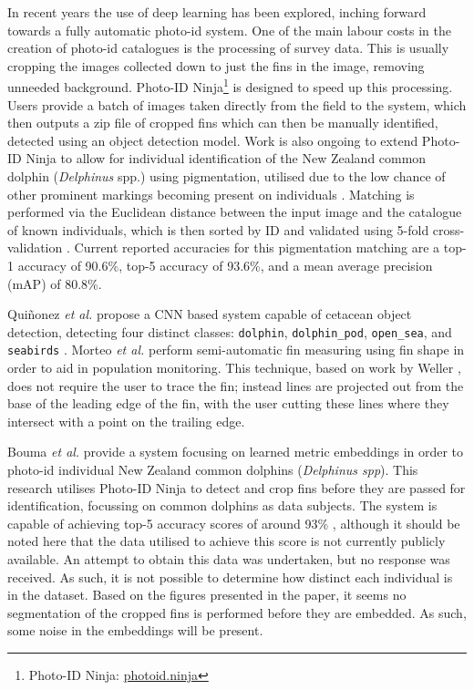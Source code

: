 In recent years the use of deep learning has been explored, inching forward towards a fully automatic photo-id system. One of the main labour costs in the creation of photo-id catalogues is the processing of survey data. This is usually cropping the images collected down to just the fins in the image, removing unneeded background. Photo-ID Ninja\footnote{\label{footnote:photo-idNinja}Photo-ID Ninja: \href{http://photoid.ninja}{photoid.ninja}} is designed to speed up this processing. Users provide a batch of images taken directly from the field to the system, which then outputs a zip file of cropped fins which can then be manually identified, detected using an object detection model.  Work is also ongoing to extend Photo-ID Ninja to allow for individual identification of the New Zealand common dolphin (\textit{Delphinus} spp.) using pigmentation, utilised due to the low chance of other prominent markings becoming present on individuals \cite{gilman_computer-assisted_2016}. Matching is performed via the Euclidean distance between the input image and the catalogue of known individuals, which is then sorted by ID and validated using 5-fold cross-validation \cite{bouma_individual_2018}. Current reported accuracies for this pigmentation matching are a top-1 accuracy of 90.6\%, top-5 accuracy of 93.6\%, and a mean average precision (mAP) of 80.8\%.

Qui\~{n}onez \textit{et al.} propose a CNN based system capable of cetacean object detection, detecting four distinct classes: \texttt{dolphin}, \texttt{dolphin\_pod}, \texttt{open\_sea}, and \texttt{seabirds} \cite{quinonez_using_2019}. Morteo \textit{et al.} \cite{morteo_phenotypic_2017} perform semi-automatic fin measuring using fin shape in order to aid in population monitoring. This technique, based on work by Weller \cite{weller_global_1998}, does not require the user to trace the fin; instead lines are projected out from the base of the leading edge of the fin, with the user cutting these lines where they intersect with a point on the trailing edge. 

Bouma \textit{et al.} provide a system focusing on learned metric embeddings in order to photo-id individual New Zealand common dolphins (\textit{Delphinus spp}). This research utilises Photo-ID Ninja to detect and crop fins before they are passed for identification, focussing on common dolphins as data subjects. The system is capable of achieving top-5 accuracy scores of around 93\% \cite{bouma_individual_2018}, although it should be noted here that the data utilised to achieve this score is not currently publicly available. An attempt to obtain this data was undertaken, but no response was received. As such, it is not possible to determine how distinct each individual is in the dataset. Based on the figures presented in the paper, it seems no segmentation of the cropped fins is performed before they are embedded. As such, some noise in the embeddings will be present. 

